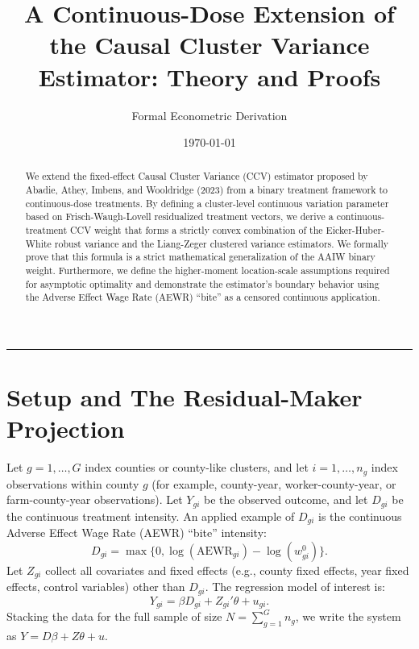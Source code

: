 \documentclass[11pt, letterpaper]{article}
\title{A Continuous-Dose Extension of the Causal Cluster Variance Estimator: Theory and Proofs}
\author{Formal Econometric Derivation}
\date{\today}
\theoremstyle{remark}
\begin{document}
\maketitle

\begin{abstract}
    \noindent We extend the fixed-effect Causal Cluster Variance (CCV) estimator proposed by Abadie, Athey, Imbens, and Wooldridge (2023) from a binary treatment framework to continuous-dose treatments. By defining a cluster-level continuous variation parameter based on Frisch-Waugh-Lovell residualized treatment vectors, we derive a continuous-treatment CCV weight that forms a strictly convex combination of the Eicker-Huber-White robust variance and the Liang-Zeger clustered variance estimators. We formally prove that this formula is a strict mathematical generalization of the AAIW binary weight. Furthermore, we define the higher-moment location-scale assumptions required for asymptotic optimality and demonstrate the estimator's boundary behavior using the Adverse Effect Wage Rate (AEWR) ``bite'' as a censored continuous application.
\end{abstract}

\vspace{2em}
\hrule
\vspace{2em}

\section{Setup and The Residual-Maker Projection}

Let $g=1,\dots,G$ index counties or county-like clusters, and let $i=1,\dots,n_g$ index observations within county $g$ (for example, county-year, worker-county-year, or farm-county-year observations). Let $Y_{gi}$ be the observed outcome, and let $D_{gi}$ be the continuous treatment intensity. An applied example of $D_{gi}$ is the continuous Adverse Effect Wage Rate (AEWR) ``bite'' intensity:
\begin{equation}
    D_{gi} = \max\{0, \log(\text{AEWR}_{gi}) - \log(w^0_{gi})\}.
\end{equation}
Let $Z_{gi}$ collect all covariates and fixed effects (e.g., county fixed effects, year fixed effects, control variables) other than $D_{gi}$. The regression model of interest is:
\begin{equation}
    Y_{gi} = \beta D_{gi} + Z_{gi}'\theta + u_{gi}.
\end{equation}
Stacking the data for the full sample of size $N = \sum_{g=1}^G n_g$, we write the system as $Y = D\beta + Z\theta + u$.
\end{document}
